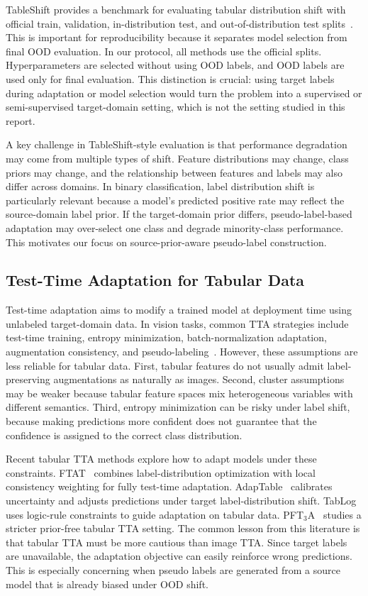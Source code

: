 \documentclass{article}
\begin{document}
TableShift provides a benchmark for evaluating tabular distribution shift with official train, validation, in-distribution test, and out-of-distribution test splits~\citep{gardner2023tableshift}. This is important for reproducibility because it separates model selection from final OOD evaluation. In our protocol, all methods use the official splits. Hyperparameters are selected without using OOD labels, and OOD labels are used only for final evaluation. This distinction is crucial: using target labels during adaptation or model selection would turn the problem into a supervised or semi-supervised target-domain setting, which is not the setting studied in this report.

A key challenge in TableShift-style evaluation is that performance degradation may come from multiple types of shift. Feature distributions may change, class priors may change, and the relationship between features and labels may also differ across domains. In binary classification, label distribution shift is particularly relevant because a model's predicted positive rate may reflect the source-domain label prior. If the target-domain prior differs, pseudo-label-based adaptation may over-select one class and degrade minority-class performance. This motivates our focus on source-prior-aware pseudo-label construction.

\subsection{Test-Time Adaptation for Tabular Data}

Test-time adaptation aims to modify a trained model at deployment time using unlabeled target-domain data. In vision tasks, common TTA strategies include test-time training, entropy minimization, batch-normalization adaptation, augmentation consistency, and pseudo-labeling~\citep{sun2020testtime,wang2021tent}. However, these assumptions are less reliable for tabular data. First, tabular features do not usually admit label-preserving augmentations as naturally as images. Second, cluster assumptions may be weaker because tabular feature spaces mix heterogeneous variables with different semantics. Third, entropy minimization can be risky under label shift, because making predictions more confident does not guarantee that the confidence is assigned to the correct class distribution.

Recent tabular TTA methods explore how to adapt models under these constraints. FTAT~\citep{zhou2024ftat} combines label-distribution optimization with local consistency weighting for fully test-time adaptation. AdapTable~\citep{kim2024adaptable} calibrates uncertainty and adjusts predictions under target label-distribution shift. TabLog~\citep{ren2024tablog} uses logic-rule constraints to guide adaptation on tabular data. PFT$_3$A~\citep{he2026pft3a} studies a stricter prior-free tabular TTA setting. The common lesson from this literature is that tabular TTA must be more cautious than image TTA. Since target labels are unavailable, the adaptation objective can easily reinforce wrong predictions. This is especially concerning when pseudo labels are generated from a source model that is already biased under OOD shift.
\end{document}
